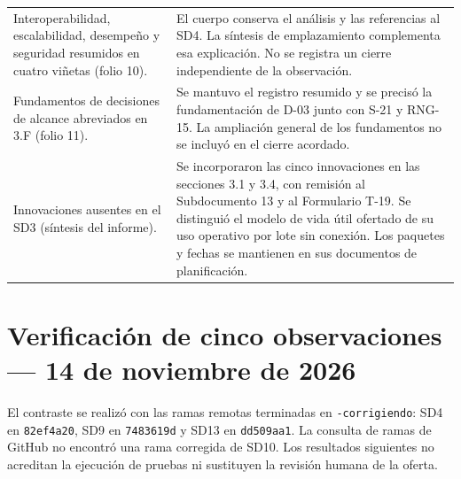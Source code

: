 \documentclass[11pt,letterpaper]{article}
\begin{document}
\begin{longtable}{@{}P{0.33\textwidth}P{\tabcolsep\relax}@{}}
Interoperabilidad, escalabilidad, desempeño y seguridad resumidos en cuatro viñetas (folio 10). &
El cuerpo conserva el análisis y las referencias al SD4. La síntesis de emplazamiento complementa esa explicación. No se registra un cierre independiente de la observación. \\
Fundamentos de decisiones de alcance abreviados en 3.F (folio 11). &
Se mantuvo el registro resumido y se precisó la fundamentación de D-03 junto con S-21 y RNG-15. La ampliación general de los fundamentos no se incluyó en el cierre acordado. \\
Innovaciones ausentes en el SD3 (síntesis del informe). &
Se incorporaron las cinco innovaciones en las secciones 3.1 y 3.4, con remisión al Subdocumento 13 y al Formulario T-19. Se distinguió el modelo de vida útil ofertado de su uso operativo por lote sin conexión. Los paquetes y fechas se mantienen en sus documentos de planificación. \\
\end{longtable}

\section*{Verificación de cinco observaciones — 14 de noviembre de 2026}

El contraste se realizó con las ramas remotas terminadas en \texttt{-corrigiendo}: SD4 en \texttt{82ef4a20}, SD9 en \texttt{7483619d} y SD13 en \texttt{dd509aa1}. La consulta de ramas de GitHub no encontró una rama corregida de SD10. Los resultados siguientes no acreditan la ejecución de pruebas ni sustituyen la revisión humana de la oferta.
\end{document}
